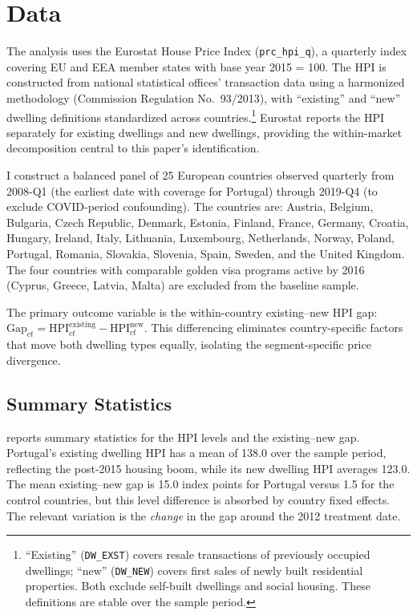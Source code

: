 \documentclass[12pt]{article}
\begin{document}
\section{Data}

The analysis uses the Eurostat House Price Index (\texttt{prc\_hpi\_q}), a quarterly index covering EU and EEA member states with base year 2015 = 100. The HPI is constructed from national statistical offices' transaction data using a harmonized methodology (Commission Regulation No.~93/2013), with ``existing'' and ``new'' dwelling definitions standardized across countries.\footnote{``Existing'' (\texttt{DW\_EXST}) covers resale transactions of previously occupied dwellings; ``new'' (\texttt{DW\_NEW}) covers first sales of newly built residential properties. Both exclude self-built dwellings and social housing. These definitions are stable over the sample period.} Eurostat reports the HPI separately for existing dwellings and new dwellings, providing the within-market decomposition central to this paper's identification.

I construct a balanced panel of 25 European countries observed quarterly from 2008-Q1 (the earliest date with coverage for Portugal) through 2019-Q4 (to exclude COVID-period confounding). The countries are: Austria, Belgium, Bulgaria, Czech Republic, Denmark, Estonia, Finland, France, Germany, Croatia, Hungary, Ireland, Italy, Lithuania, Luxembourg, Netherlands, Norway, Poland, Portugal, Romania, Slovakia, Slovenia, Spain, Sweden, and the United Kingdom. The four countries with comparable golden visa programs active by 2016 (Cyprus, Greece, Latvia, Malta) are excluded from the baseline sample.

The primary outcome variable is the within-country existing--new HPI gap: $\text{Gap}_{ct} = \text{HPI}^{\text{existing}}_{ct} - \text{HPI}^{\text{new}}_{ct}$. This differencing eliminates country-specific factors that move both dwelling types equally, isolating the segment-specific price divergence.

\subsection{Summary Statistics}



 reports summary statistics for the HPI levels and the existing--new gap. Portugal's existing dwelling HPI has a mean of 138.0 over the sample period, reflecting the post-2015 housing boom, while its new dwelling HPI averages 123.0. The mean existing--new gap is 15.0 index points for Portugal versus 1.5 for the control countries, but this level difference is absorbed by country fixed effects. The relevant variation is the \textit{change} in the gap around the 2012 treatment date.
\end{document}
